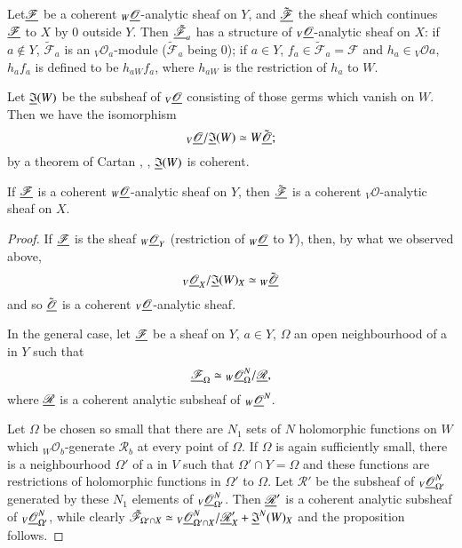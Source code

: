 Let\pageoriginale $\underline{\mathscr{F}}$ be a coherent ${}_W
\underline{\mathscr{O}}$-analytic sheaf on $Y$, and $\tilde{\underline{\mathscr{F}}}$
the sheaf which continues $\underline{\mathscr{F}}$ to $X$ by $0$ outside
$Y$. Then $\tilde{\underline{\mathscr{F}}_a}$ has a structure of ${}_V
\underline{\mathscr{O}}$-analytic sheaf on $X$: if $a \not\in Y$,
$\tilde{\mathscr{F}}_a$ is an ${}_V \mathscr{O}_a$-module
($\tilde{\mathscr{F}}_a$ being 0); if $a \in Y$, $f_a \in \tilde{\mathscr{F}}_a
= \mathscr{F}$  and $h_a \in {}_V \mathscr{O}a$, $h_a f_a$ is defined
to be $h_{aW} f_a$, where $h_{aW}$ is the restriction of $h_a$ to
$W$. 

Let $\underline{\mathfrak{I}}(W)$ be the subsheaf of ${}_V\underline{\mathscr{O}}$
consisting of those germs which vanish on $W$. Then we have the
isomorphism
$$
{}_V \underline{\mathscr{O}} / \underline{\mathfrak{I}} (W) \simeq W
\tilde{\underline{\mathscr{O}}} ; 
$$
by a theorem of Cartan \cite{p3:key2}, \cite[lecture XVI]{p3:key3},
$\underline{\mathfrak{I}} (W)$  is coherent.

\begin{proposition}\label{chap15:prop3}
If $\underline{\mathscr{F}}$ is a coherent ${}_W\underline{\mathscr{O}}$-analytic
sheaf on $Y$, then $\tilde{\underline{\mathscr{F}}}$ is a coherent
${}_V\mathscr{O}$-analytic sheaf on $X$. 
\end{proposition}

\begin{proof}
If $\underline{\mathscr{F}}$ is the sheaf ${}_W \underline{\mathscr{O}}_Y$
(restriction of ${}_W\underline{\mathscr{O}}$ to $Y$), then, by what we
observed above,
$$
{}_V \underline{\mathscr{O}}_X / \underline{\mathfrak{I}} (W)_X \simeq {}_W
\tilde{\underline{\mathscr{O}}} 
$$
and so $\tilde{\underline{\mathscr{O}}}$ is a coherent ${}_V
\underline{\mathscr{O}}$-analytic sheaf.

In the general case, let $\underline{\mathscr{F}}$ be a sheaf on $Y$, $a \in
Y$, $\Omega$ an open neighbourhood of a in $Y$ such that 
$$
\underline{\mathscr{F}}_\Omega \simeq {}_W \underline{\mathscr{O}}^N_\Omega /
\underline{\mathscr{R}}, 
$$
where $\underline{\mathscr{R}}$ is a coherent analytic subsheaf of
${}_W\underline{\mathscr{O}}^N$.

Let $\Omega$ be chosen so small that there are $N_1$ sets of $N$
holomorphic functions on $W$ which ${}_W \mathscr{O}_b$-generate
$\mathscr{R}_b$ at every point of $\Omega$. If $\Omega$ is again
sufficiently small, there is a neighbourhood $\Omega'$ of a in $V$
such that $\Omega' \cap Y = \Omega$ and these functions are
restrictions of holomorphic functions in $\Omega'$ to $\Omega$.
Let $\mathscr{R}'$ be the subsheaf of
${}_V\underline{\mathscr{O}}^N_{\Omega'}$ generated by these\pageoriginale
$N_1$ elements of ${}_V\underline{\mathscr{O}}^N_{\Omega'}$. Then
$\underline{\mathscr{R}}'$ is a coherent analytic subsheaf of
${}_V\underline{\mathscr{O}}^N_{\Omega'}$, while clearly
$\tilde{\mathscr{F}}_{\Omega' \cap X} \simeq
{}_V\underline{\mathscr{O}}^N_{\Omega' \cap X} / \underline{\mathscr{R}}'_X +
\underline{\mathfrak{I}}^N (W)_X$ and the proposition follows.
\end{proof}

